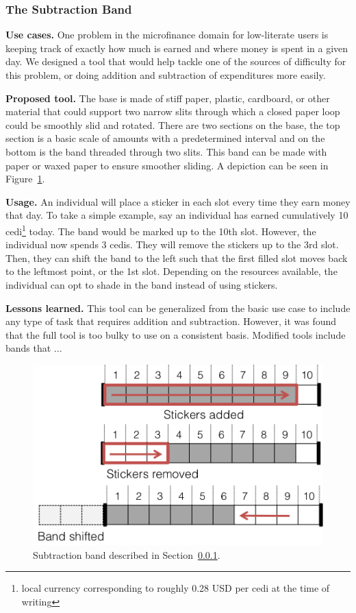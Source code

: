 \documentclass{sig-alternate}
\begin{document}
\subsubsection{The Subtraction Band}
\label{sec:subtraction}

\textbf{Use cases.}
One problem in the microfinance domain for low-literate users is keeping track of exactly how much is earned and where money is spent in a given day. We designed a tool that would help tackle one of the sources of difficulty for this problem, or doing addition and subtraction of expenditures more easily.

\textbf{Proposed tool.}
The base is made of stiff paper, plastic, cardboard, or other material that could support two narrow slits through which a closed paper loop could be smoothly slid and rotated. There are two sections on the base, the top section is a basic scale of amounts with a predetermined interval and on the bottom is the band threaded through two slits. This band can be made with paper or waxed paper to ensure smoother sliding. A depiction can be seen in Figure~\ref{fig:band}.

\textbf{Usage.}
An individual will place a sticker in each slot every time they earn money that day. To take a simple example, say an individual has earned cumulatively 10 cedi\footnote{local currency corresponding to roughly 0.28 USD per cedi at the time of writing} today. The band would be marked up to the 10th slot. However, the individual now spends 3 cedis. They will remove the stickers up to the 3rd slot. Then, they can shift the band to the left such that the first filled slot moves back to the leftmost point, or the 1st slot.
Depending on the resources available, the individual can opt to shade in the band instead of using stickers.

\textbf{Lessons learned.}
This tool can be generalized from the basic use case to include any type of task that requires addition and subtraction. However, it was found that the full tool is too bulky to use on a consistent basis. Modified tools include bands that ... 

\begin{figure}
\centering
\includegraphics[width=.8\linewidth]{img/band.png}
\caption{Subtraction band described in Section~\ref{sec:subtraction}.}
\label{fig:band}
\end{figure}
\end{document}
